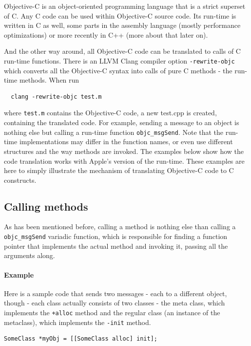 Objective-C is an object-oriented programming language that is a strict superset of C. Any C code can be used within Objective-C source code. Its run-time is written in C as well, some parts in the assembly language (mostly performance optimizations) or more recently in C++ (more about that later on).

And the other way around, all Objective-C code can be translated to calls of C run-time functions. There is an LLVM Clang compiler option \verb=-rewrite-objc= which converts all the Objective-C syntax into calls of pure C methods - the run-time methods. When run 

\begin{verbatim}
  clang -rewrite-objc test.m
\end{verbatim}

where \verb=test.m= contains the Objective-C code, a new test.cpp is created, containing the translated code. For example, sending a message to an object is nothing else but calling a run-time function \verb=objc_msgSend=. Note that the run-time implementations may differ in the function names, or even use different structures and the way methods are invoked. The examples below show how the code translation works with Apple's version of the run-time. These examples are here to simply illustrate the mechanism of translating Objective-C code to C constructs.

\subsection{Calling methods}

As has been mentioned before, calling a method is nothing else than calling a \verb=objc_msgSend= variadic function, which is responsible for finding a function pointer that implements the actual method and invoking it, passing all the arguments along.

\paragraph{Example}
Here is a sample code that sends two messages - each to a different object, though - each class actually consists of two classes - the meta class, which implements the \verb=+alloc= method and the regular class (an instance of the metaclass), which implements the \verb=-init= method.

\begin{verbatim}SomeClass *myObj = [[SomeClass alloc] init];\end{verbatim}

